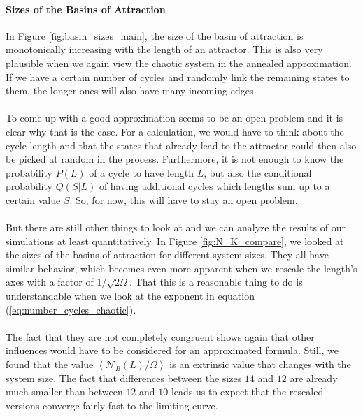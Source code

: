 \paragraph*{Sizes of the Basins of Attraction}
In Figure \ref{fig:basin_sizes_main}, the size of the basin of attraction is monotonically increasing with the length of an attractor. This is also very plausible when we again view the chaotic system in the annealed approximation. If we have a certain number of cycles and randomly link the remaining states to them, the longer ones will also have many incoming edges. 

\paragraph*{}
To come up with a good approximation seems to be an open problem and it is clear why that is the case. For a calculation, we would have to think about the cycle length and that the states that already lead to the attractor could then also be picked at random in the process. Furthermore, it is not enough to know the probability $P(L)$ of a cycle to have length $L$, but also the conditional probability $Q(S|L)$ of having additional cycles which lengths sum up to a certain value $S$. So, for now, this will have to stay an open problem.

\paragraph*{}
But there are still other things to look at and we can analyze the results of our simulations at least quantitatively. In Figure \ref{fig:N_K_compare}, we looked at the sizes of the basins of attraction for different system sizes. They all have similar behavior, which becomes even more apparent when we rescale the length's axes with a factor of $1/\sqrt{2\Omega}$. That this is a reasonable thing to do is understandable when we look at the exponent in equation (\ref{eq:number_cycles_chaotic}). 

\paragraph*{}
The fact that they are not completely congruent shows again that other influences would have to be considered for an approximated formula. Still, we found that the value $\left\langle\mathcal{N}_B(L)/\Omega\right\rangle$ is an extrinsic value that changes with the system size. The fact that differences between the sizes $14$ and $12$ are already much smaller than between $12$ and $10$ leads us to expect that the rescaled versions converge fairly fast to the limiting curve.

